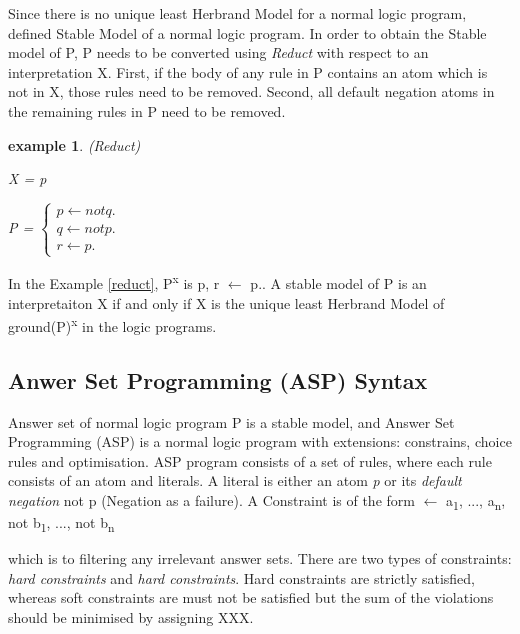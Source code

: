\documentclass[12pt,twoside]{report}
\newtheorem{examp}{example}[section]
\begin{document}
Since there is no unique least Herbrand Model for a normal logic program, \cite{Gelfond1988} defined Stable Model of a normal logic program. In order to obtain the Stable model of P, P needs to be converted using \textit{Reduct} with respect to an interpretation X. First, if the body of any rule in P contains an atom which is not in X, those rules need to be removed. Second, all default negation atoms in the remaining rules in P need to be removed.

\begin{examp} \normalfont (Reduct)

X = {p}

P = $\begin{cases}
	p  \leftarrow not q. \\
  q  \leftarrow not p. \\
  r  \leftarrow p.
      \end{cases}$
\end{examp}
\label{reduct}

In the Example \ref{reduct}, P\textsuperscript{x} is {p, r $\leftarrow$ p.}.
A stable model of P is an interpretaiton X if and only if X is the unique least Herbrand Model of ground(P)\textsuperscript{x} in the logic programs.

\subsection{Anwer Set Programming (ASP) Syntax}

Answer set of normal logic program P is a stable model, and Answer Set Programming (ASP) is a normal logic program with extensions: constrains, choice rules and optimisation. ASP program consists of a set of rules, where each rule consists of an atom and literals.
A literal is either an atom \textit{p} or its \textit{default negation} not p (Negation as a failure).
A Constraint is of the form $\leftarrow$ a\textsubscript{1}, ..., a\textsubscript{n}, not b\textsubscript{1}, ..., not b\textsubscript{n}

which is to filtering any irrelevant answer sets.
There are two types of constraints: \textit{hard constraints} and \textit{hard constraints}. Hard constraints are strictly satisfied, whereas soft constraints are must not be satisfied but the sum of the violations should be minimised by assigning XXX.
\end{document}
